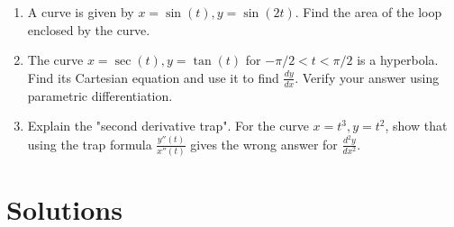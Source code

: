 \documentclass{article}
\begin{document}
\begin{enumerate}
\item A curve is given by $x=\sin(t), y=\sin(2t)$. Find the area of the loop enclosed by the curve.

\item The curve $x = \sec(t), y=\tan(t)$ for $-\pi/2 < t < \pi/2$ is a hyperbola. Find its Cartesian equation and use it to find $\frac{dy}{dx}$. Verify your answer using parametric differentiation.

\item Explain the "second derivative trap". For the curve $x=t^3, y=t^2$, show that using the trap formula $\frac{y''(t)}{x''(t)}$ gives the wrong answer for $\frac{d^2y}{dx^2}$.

\end{enumerate}

\section*{Solutions}
\end{document}
